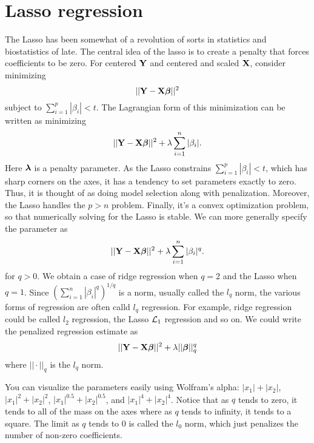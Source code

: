 \section{Lasso regression}

The Lasso has been somewhat of a revolution of sorts in statistics and biostatistics
of late. The central idea of the lasso is to create a penalty that forces
coefficients to be zero. For centered $\mathbf{Y}$ and centered and scaled $\mathbf{X}$, 
consider minimizing
$$
|| \mathbf{Y} - \mathbf{X} \boldsymbol{\beta}||^2
$$
subject to $\sum_{i=1}^p | \beta_i| < t$. The Lagrangian form of this minimization
can be written as minimizing
$$
|| \mathbf{Y} - \mathbf{X} \boldsymbol{\beta}||^2 + \lambda \sum_{i=1}^n | \beta_i|.
$$
Here $\boldsymbol{\lambda}$ is a penalty parameter. As the Lasso constrains
$\sum_{i=1}^p | \beta_i| < t$, which has sharp corners on the axes,
it has a tendency to set parameters exactly to zero. Thus, it is 
thought of as doing model selection along with penalization. 
Moreover, the Lasso handles the $p > n$ problem. Finally, it's
a convex optimization problem, so that numerically solving 
for the Lasso is stable. We can more generally specify the parameter
as
$$
|| \mathbf{Y} - \mathbf{X} \boldsymbol{\beta}||^2 + \lambda \sum_{i=1}^n | \beta_i |^q.
$$
for $q > 0$. We obtain a case of ridge regression when $q=2$ and
the Lasso when $q=1$. Since $(\sum_{i=1}^n | \beta_i |^q)^{1/q}$ is a norm,
usually called the $l_q$ norm, the various forms of
regression are often calld $l_q$ regression. For example,
ridge regression could be called $l_2$ regression, the Lasso
${\cal L}_1$ regression and so on. We could write the penalized regression estimate as
$$
|| \mathbf{Y} - \mathbf{X} \boldsymbol{\beta}||^2 + \lambda ||\boldsymbol{\beta}||_q^q
$$
where $||\cdot||_q$ is the $l_q$ norm.


You can visualize the parameters easily using Wolfram's alpha:
\href{http://www.wolframalpha.com/input/?i=abs\%28x1\%29+\%2B+abs\%28x2\%29+\%3D+1}{$|x_1| + |x_2|$},
\href{http://www.wolframalpha.com/input/?i=abs\%28x1\%29\%5E2+\%2B+abs\%28x2\%29\%5E2+\%3D+1}{$|x_1|^2 + |x_2|^2$},
\href{http://www.wolframalpha.com/input/?i=abs\%28x1\%29\%5E0.5+\%2B+abs\%28x2\%29\%5E0.5+\%3D+1}{$|x_1|^0.5 + |x_2|^0.5$},
and \href{http://www.wolframalpha.com/input/?i=plot+abs\%28x1\%29\%5E4+\%2B+abs\%28x2\%29\%5E4+\%3D+1}{$|x_1|^4 + |x_2|^4$}.
Notice that as $q$ tends to zero, it tends to all of the mass on the axes where as $q$ tends to infinity, it tends
to a square. The limit as $q$ tends to 0 is called the $l_0$ norm, which just penalizes the number
of non-zero coefficients. 

